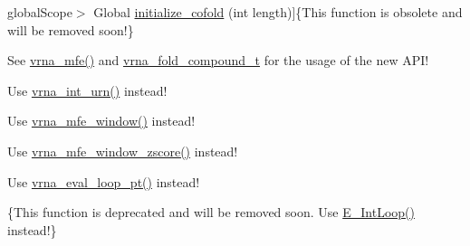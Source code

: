 \begin{DoxyRefList}
global\+Scope$>$ Global \hyperlink{group__mfe__cofold_gafee0c32208aa2ac97338b6e3fbad7fa5}{initialize\+\_\+cofold} (int length)]\{This function is obsolete and will be removed soon!\}  
\item[\label{deprecated__deprecated000075}%
\hypertarget{deprecated__deprecated000075}{}%
global\+Scope$>$ Global \hyperlink{group__mfe__fold__single_gac3f0a28d9cb609d388b155445073fd20}{initialize\+\_\+fold} (int length)]See \hyperlink{group__mfe__fold_gabd3b147371ccf25c577f88bbbaf159fd}{vrna\+\_\+mfe()} and \hyperlink{group__fold__compound_ga1b0cef17fd40466cef5968eaeeff6166}{vrna\+\_\+fold\+\_\+compound\+\_\+t} for the usage of the new A\+P\+I! 
\item[\label{deprecated__deprecated000154}%
\hypertarget{deprecated__deprecated000154}{}%
global\+Scope$>$ Global \hyperlink{utils_8h_a68ff0849d44f62fe491800378a5ffcb4}{int\+\_\+urn} (int from, int to)]Use \hyperlink{group__utils_ga46111bb3747dbcf4609f0d40ae169ad9}{vrna\+\_\+int\+\_\+urn()} instead!  
\item[\label{deprecated__deprecated000079}%
\hypertarget{deprecated__deprecated000079}{}%
global\+Scope$>$ Global \hyperlink{group__local__mfe__fold_ga16e5a70e60835bb969eaecbe6482f1be}{Lfold} (const char $\ast$string, char $\ast$structure, int maxdist)]Use \hyperlink{group__local__mfe__fold_ga689df235a1915a1ad56e377383c044ce}{vrna\+\_\+mfe\+\_\+window()} instead!  
\item[\label{deprecated__deprecated000080}%
\hypertarget{deprecated__deprecated000080}{}%
global\+Scope$>$ Global \hyperlink{group__local__mfe__fold_gab6d79eecc180f586679f7b85cce5cbe9}{Lfoldz} (const char $\ast$string, char $\ast$structure, int maxdist, int zsc, double min\+\_\+z)]Use \hyperlink{group__local__mfe__fold_gaa4f67ae94efd08d800c17f9b53423fd6}{vrna\+\_\+mfe\+\_\+window\+\_\+zscore()} instead!  
\item[\label{deprecated__deprecated000057}%
\hypertarget{deprecated__deprecated000057}{}%
global\+Scope$>$ Global \hyperlink{group__eval_ga507d4fd93f4b398d793ba2402731388d}{loop\+\_\+energy} (short $\ast$ptable, short $\ast$s, short $\ast$s1, int i)]Use \hyperlink{group__eval_ga730ba4df55c02fd530a0cddd49faf760}{vrna\+\_\+eval\+\_\+loop\+\_\+pt()} instead! 
\item[\label{deprecated__deprecated000073}%
\hypertarget{deprecated__deprecated000073}{}%
global\+Scope$>$ Global \hyperlink{group__mfe__fold__single_ga2163034a25c6115d894b199e97e03f6c}{Loop\+Energy} (int n1, int n2, int type, int type\+\_\+2, int si1, int sj1, int sp1, int sq1)]\{This function is deprecated and will be removed soon. Use \hyperlink{group__loops_ga0266d2c7a6098259280fb97e9f980b34}{E\+\_\+\+Int\+Loop()} instead!\}  

\end{DoxyRefList}
